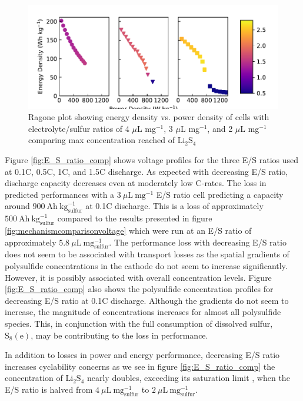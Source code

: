 \documentclass{elsarticle}
\begin{document}
\begin{figure}[b!]
    \centering
    \includegraphics[width=\textwidth]{Figures/Figure8_Ragone_Li2S4.pdf}
    \caption{Ragone plot showing energy density vs. power density of cells with electrolyte/sulfur ratios of 4 $\mu$L mg$^{-1}$, 3 $\mu$L mg$^{-1}$, and 2 $\mu$L mg$^{-1}$ comparing max concentration reached of Li$_2$S$_4$}
    \label{fig:ragoneLi2S4}
\end{figure}

Figure \ref{fig:E_S_ratio_comp} shows voltage profiles for the three E/S ratios used at 0.1C, 0.5C, 1C, and 1.5C discharge. As expected with decreasing E/S ratio, discharge capacity decreases even at moderately low C-rates. The loss in predicted performances with a $3 ~ \mu\mathrm{L} ~ \mathrm{mg}^{-1}$ E/S ratio cell predicting a capacity around $900 ~ \mathrm{Ah} ~ \mathrm{kg}^{-1}_\mathrm{sulfur}$ at 0.1C discharge. This is a loss of approximately $500 ~ \mathrm{Ah} ~ \mathrm{kg}^{-1}_\mathrm{sulfur}$ compared to the results presented in figure \ref{fig:mechanismcomparisonvoltage} which were run at an E/S ratio of approximately $5.8 ~ \mu \mathrm{L} ~ \mathrm{mg}^{-1}_\mathrm{sulfur}$. The performance loss with decreasing E/S ratio does not seem to be associated with transport losses as the spatial gradients of polysulfide concentrations in the cathode do not seem to increase significantly. However, it is possibly associated with overall concentration levels. Figure \ref{fig:E_S_ratio_comp} also shows the polysulfide concentration profiles for decreasing E/S ratio at 0.1C discharge. Although the gradients do not seem to increase, the magnitude of concentrations increases for almost all polysulfide species. This, in conjunction with the full consumption of dissolved sulfur, $\mathrm{S}_8(\mathrm{e})$, may be contributing to the loss in performance. 

In addition to losses in power and energy performance, decreasing E/S ratio increases cyclability concerns as we see in figure \ref{fig:E_S_ratio_comp} the concentration of $\mathrm{Li}_2\mathrm{S}_4$ nearly doubles, exceeding its saturation limit \cite{ANDREI2018469}, when the E/S ratio is halved from $4 ~ \mu\mathrm{L} ~ \mathrm{mg}^{-1}_\mathrm{sulfur}$ to $2 ~ \mu\mathrm{L} ~ \mathrm{mg}^{-1}_\mathrm{sulfur}$. 
\end{document}
